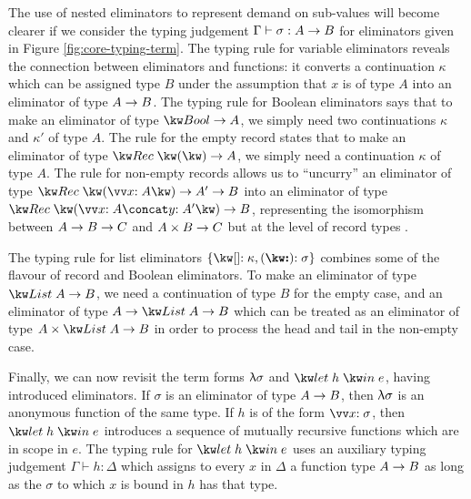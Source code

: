 The use of nested eliminators to represent demand on sub-values will become clearer if we consider the typing judgement $\Gamma \vdash \sigma: {A}\rightarrow{B}$ for eliminators given in Figure \ref{fig:core-typing-term}. The typing rule for variable eliminators reveals the connection between eliminators and functions: it converts a continuation $\kappa$ which can be assigned type $B$ under the assumption that $x$ is of type $A$ into an eliminator of type ${A}\rightarrow{B}$. The typing rule for Boolean eliminators says that to make an eliminator of type $\tyFun{\tyBool}{A}$, we simply need two continuations $\kappa$ and $\kappa'$ of type $A$. The rule for the empty record states that to make an eliminator of type $\tyFun{\tyRec{}}{A}$, we simply need a continuation $\kappa$ of type $A$. The rule for non-empty records allows us to ``uncurry'' an eliminator of type $\tyFun{\tyRec{\vec{\bind{x}{A}}}}{\tyFun{A'}{B}}$ into an eliminator of type $\tyFun{\tyRec{\vec{\bind{x}{A}} \concat \bind{y}{A'}}}{B}$, representing the isomorphism between ${{A}\rightarrow{B}}\rightarrow{C}$ and ${{A}\times{B}}\rightarrow{C}$ but at the level of record types \cite{hinze00}.

The typing rule for list eliminators $\elimList{\kappa}{\sigma}$ combines some of the flavour of record and Boolean eliminators. To make an eliminator of type $\tyFun{\tyList{A}}{B}$, we need a continuation of type $B$ for the empty case, and an eliminator of type $\tyFun{A}{\tyFun{\tyList{A}}{B}}$ which can be treated as an eliminator of type $\tyFun{\tyProd{A}{\tyList{A}}}{B}$ in order to process the head and tail in the non-empty case.

Finally, we can now revisit the term forms $\uplambda{\sigma}$ and $\exLetRecMutual{h}{e}$, having introduced eliminators. If $\sigma$ is an eliminator of type ${A}\rightarrow{B}$, then $\uplambda{\sigma}$ is an anonymous function of the same type. If $h$ is of the form $\vec{\bind{x}{\sigma}}$, then $\exLetRecMutual{h}{e}$ introduces a sequence of mutually recursive functions which are in scope in $e$. The typing rule for $\exLetRecMutual{h}{e}$ uses an auxiliary typing judgement $\Gamma \vdash h : \Delta$ which assigns to every $x$ in $\Delta$ a function type ${A}\rightarrow{B}$ as long as the $\sigma$ to which $x$ is bound in $h$ has that type.



